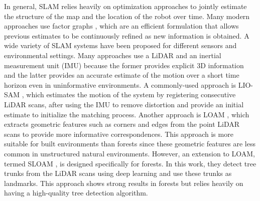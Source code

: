 In general, SLAM relies heavily on optimization approaches to jointly estimate the structure of the map and the location of the robot over time. Many modern approaches use factor graphs \cite{Dellaert2017FactorPerception}, which are an efficient formulation that allows previous estimates to be continuously refined as new information is obtained. A wide variety of SLAM systems have been proposed for different sensors and environmental settings. Many approaches use a LiDAR and an inertial measurement unit (IMU) because the former provides explicit 3D information and the latter provides an accurate estimate of the motion over a short time horizon even in uninformative environments. A commonly-used approach is LIO-SAM \cite{Shan2020LIO-SAM:Mapping}, which estimates the motion of the system by registering consecutive LiDAR scans, after using the IMU to remove distortion and provide an initial estimate to initialize the matching process. Another approach is LOAM \cite{Zhang2017}, which extracts geometric features such as corners and edges from the point LiDAR scans to provide more informative correspondences. This approach is more suitable for built environments than forests since these geometric features are less common in unstructured natural environments. However, an extension to LOAM, termed SLOAM \cite{Chen2020SLOAM:Inventory}, is designed specifically for forests. In this work, they detect tree trunks from the LiDAR scans using deep learning and use these trunks as landmarks. This approach shows strong results in forests but relies heavily on having a high-quality tree detection algorithm.



